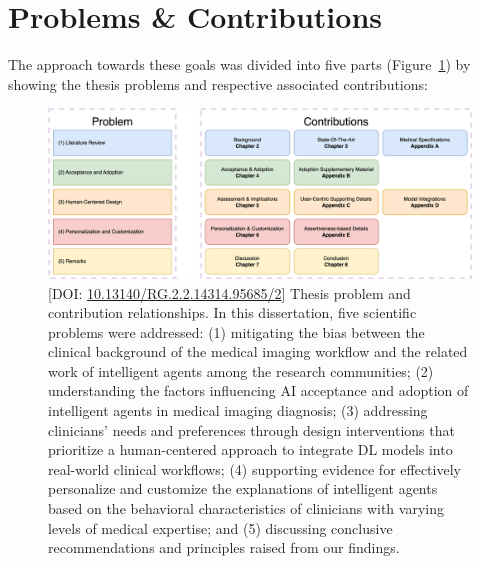 \section{Problems \& Contributions}
\label{sec:chap001004004}

\noindent
The approach towards these goals was divided into five parts (Figure~\ref{fig:fig115}) by showing the thesis problems and respective associated contributions:

\vspace{1.00mm}

\begin{figure}[ht]
\centering
\includegraphics[width=\textwidth]{images/fig115}
\caption{[DOI: \protect\href{https://www.doi.org/10.13140/RG.2.2.14314.95685/2}{10.13140/RG.2.2.14314.95685/2}] Thesis problem and contribution relationships. In this dissertation, five scientific problems were addressed: (1) mitigating the bias between the clinical background of the medical imaging workflow and the related work of intelligent agents among the research communities; (2) understanding the factors influencing AI acceptance and adoption of intelligent agents in medical imaging diagnosis; (3) addressing clinicians' needs and preferences through design interventions that prioritize a human-centered approach to integrate DL models into real-world clinical workflows; (4) supporting evidence for effectively personalize and customize the explanations of intelligent agents based on the behavioral characteristics of clinicians with varying levels of medical expertise; and (5) discussing conclusive recommendations and principles raised from our findings.}
\label{fig:fig115}
\end{figure}

